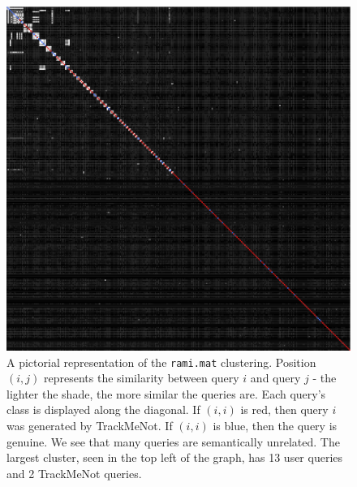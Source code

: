 \documentclass[11pt]{article}
\begin{document}
\begin{multicols}{2}
  \begin{figure}[h]
    \centering
    \includegraphics[width=\linewidth]{disco_rami_305.png}
    \caption{A pictorial representation of the \texttt{rami.mat}
      clustering. Position $(i,j)$ represents the similarity between
      query $i$ and query $j$ - the lighter the shade, the more
      similar the queries are. Each query's class is displayed along the
      diagonal. If $(i,i)$ is red, then query $i$ was generated by
      TrackMeNot. If $(i,i)$ is blue, then the query is genuine. We
      see that many queries are semantically unrelated. The largest
      cluster, seen in the top left of the graph, has 13 user queries and 2 TrackMeNot queries.}
    \label{fig:disco.rami}
  \end{figure}



\end{multicols}
\end{document}
